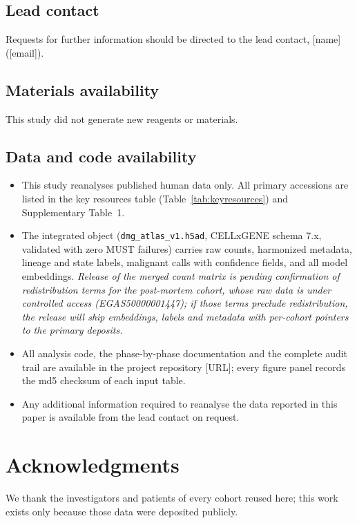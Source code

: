 \documentclass[12pt,a4paper]{article}
\begin{document}
\subsection{Lead contact}
Requests for further information should be directed to the lead contact, [name] ([email]).

\subsection{Materials availability}
This study did not generate new reagents or materials.

\subsection{Data and code availability}
\begin{itemize}\setlength\itemsep{0.1em}
  \item This study reanalyses published human data only. All primary accessions are listed in the key resources
        table (Table~\ref{tab:keyresources}) and Supplementary Table~1.
  \item The integrated object (\texttt{dmg\_atlas\_v1.h5ad}, CELLxGENE schema 7.x, validated with zero MUST
        failures) carries raw counts, harmonized metadata, lineage and state labels, malignant calls with
        confidence fields, and all model embeddings. \textit{Release of the merged count matrix is pending
        confirmation of redistribution terms for the post-mortem cohort, whose raw data is under controlled access
        (EGAS50000001447); if those terms preclude redistribution, the release will ship embeddings, labels and
        metadata with per-cohort pointers to the primary deposits.}
  \item All analysis code, the phase-by-phase documentation and the complete audit trail are available in the
        project repository [URL]; every figure panel records the md5 checksum of each input table.
  \item Any additional information required to reanalyse the data reported in this paper is available from the
        lead contact on request.
\end{itemize}

\section{Acknowledgments}

We thank the investigators and patients of every cohort reused here; this work exists only because those data were
deposited publicly.
\end{document}
